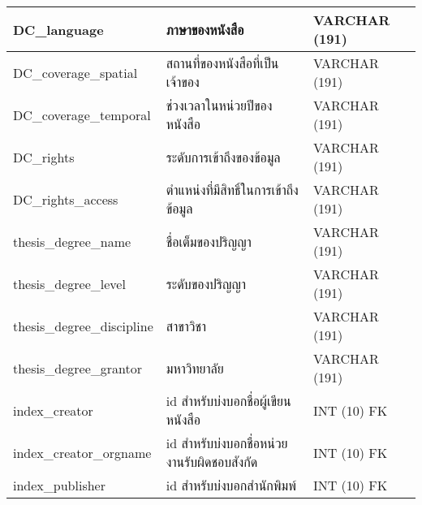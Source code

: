 \begin{longtable}[l]{|l|l|l|}
DC\_language                         & ภาษาของหนังสือ                                                & VARCHAR   (191)                                                      \\ \hline
DC\_coverage\_spatial                & สถานที่ของหนังสือที่เป็นเจ้าของ                               & VARCHAR   (191)                                                      \\ \hline
DC\_coverage\_temporal               & ช่วงเวลาในหน่วยปีของหนังสือ                                   & VARCHAR   (191)                                                      \\ \hline
DC\_rights                           & ระดับการเข้าถึงของข้อมูล                                     & VARCHAR   (191)                                                      \\ \hline
DC\_rights\_access                   & ตำแหน่งที่มีสิทธิ์ในการเข้าถึงข้อมูล                         & VARCHAR   (191)                                                      \\ \hline
thesis\_degree\_name                 & ชื่อเต็มของปริญญา                                            & VARCHAR   (191)                                                      \\ \hline
thesis\_degree\_level                & ระดับของปริญญา                                               & VARCHAR   (191)                                                      \\ \hline
thesis\_degree\_discipline           & สาขาวิชา                                                     & VARCHAR   (191)                                                      \\ \hline
thesis\_degree\_grantor              & มหาวิทยาลัย                                                  & VARCHAR   (191)                                                      \\ \hline
index\_creator                       & id สำหรับบ่งบอกชื่อผู้เขียนหนังสือ                            & INT   (10) FK                                                        \\ \hline
index\_creator\_orgname              & id สำหรับบ่งบอกชื่อหน่วยงานรับผิดชอบสังกัด                   & INT   (10) FK                                                        \\ \hline
index\_publisher                     & id สำหรับบ่งบอกสำนักพิมพ์                                    & INT   (10) FK                                                        \\ \hline

\end{longtable}

